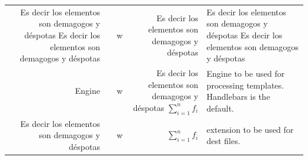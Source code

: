 \documentclass[10pt,]{krantz}
\theoremstyle{definition}
\theoremstyle{definition}
\theoremstyle{definition}
\theoremstyle{definition}
\theoremstyle{remark}
\begin{document}
\begin{longtable}[]{@{}rclrl@{}}
\begin{minipage}[t]{0.26\columnwidth}
Es decir los elementos son demagogos y déspotas Es decir los elementos son demagogos y déspotas\strut
\end{minipage} & \begin{minipage}[t]{0.08\columnwidth}\centering
1\strut
\end{minipage} & \begin{minipage}[t]{0.03\columnwidth}\raggedright
w\strut
\end{minipage} & \begin{minipage}[t]{0.23\columnwidth}\raggedleft
Es decir los elementos son demagogos y déspotas\strut
\end{minipage} & \begin{minipage}[t]{0.26\columnwidth}\raggedright
Es decir los elementos son demagogos y déspotas Es decir los elementos son demagogos y déspotas\strut
\end{minipage}\tabularnewline
\begin{minipage}[t]{0.26\columnwidth}\raggedleft
Engine\strut
\end{minipage} & \begin{minipage}[t]{0.08\columnwidth}\centering
2\strut
\end{minipage} & \begin{minipage}[t]{0.03\columnwidth}\raggedright
w\strut
\end{minipage} & \begin{minipage}[t]{0.23\columnwidth}\raggedleft
Es decir los elementos son demagogos y déspotas \(\sum^{n}_{i=1}{f_i}\)\strut
\end{minipage} & \begin{minipage}[t]{0.26\columnwidth}\raggedright
Engine to be used for processing templates. Handlebars is the default.\strut
\end{minipage}\tabularnewline
\begin{minipage}[t]{0.26\columnwidth}\raggedleft
Es decir los elementos son demagogos y déspotas\strut
\end{minipage} & \begin{minipage}[t]{0.08\columnwidth}\centering
3\strut
\end{minipage} & \begin{minipage}[t]{0.03\columnwidth}\raggedright
w\strut
\end{minipage} & \begin{minipage}[t]{0.23\columnwidth}\raggedleft
\(\sum^{n}_{i=1}{f_i}\)\strut
\end{minipage} & \begin{minipage}[t]{0.26\columnwidth}\raggedright
extension to be used for dest files.\strut
\end{minipage}\tabularnewline
\bottomrule
\end{longtable}
\end{document}
